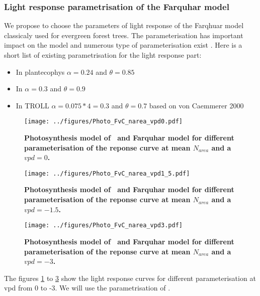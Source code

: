 \documentclass[a4paper,11pt]{article}
\begin{document}
\clearpage

\subsubsection{Light response parametrisation of the Farquhar model}

We propose to choose the parameters of light response of the Farqhuar model
classicaly used for evergreen forest trees. The parameterisation has
important impact on the model and numerous type of parameterisation
exist \citep{Rogers-2017}. Here is a short list of existing parametrisation for the
light response part:
\begin{itemize}

\item In plantecophys \citep{Duursma-2015}  $\alpha = 0.24$ and $\theta = 0.85$

\item In \citet{Medlyn-2002} $\alpha = 0.3$ and $\theta = 0.9$

\item In TROLL \citet{Marechaux-2017} $\alpha = 0.075*4 = 0.3$ and $\theta = 0.7$ based on von Caemmerer 2000

\end{itemize}


\begin{figure}[ht]
\centering
\texttt{[image: ../figures/Photo\_FvC\_narea\_vpd0.pdf]}
\caption{\textbf{Photosynthesis model of \plant\ and Farquhar model
    for different parameterisation of the reponse curve at mean $N_{area}$ and a $vpd
    = 0$.}
\label{fig:photo0}}
\end{figure}

\begin{figure}[ht]
\centering
\texttt{[image: ../figures/Photo\_FvC\_narea\_vpd1\_5.pdf]}
\caption{\textbf{Photosynthesis model of \plant\ and Farquhar model for different parameterisation of the reponse curve at mean $N_{area}$ and a $vpd = -1.5$.}
\label{fig:photo15}}
\end{figure}

\begin{figure}[ht]
\centering
\texttt{[image: ../figures/Photo\_FvC\_narea\_vpd3.pdf]}
\caption{\textbf{Photosynthesis model of \plant\ and Farquhar model for different parameterisation of the reponse curve at mean $N_{area}$ and a $vpd = -3$.}
\label{fig:photo3}}
\end{figure}

The figures \ref{fig:photo0} to \ref{fig:photo3} show the light response curves for
different parameterisation at vpd from 0 to -3. We will use the
parametrisation of \citet{Marechaux-2017}.
\end{document}
